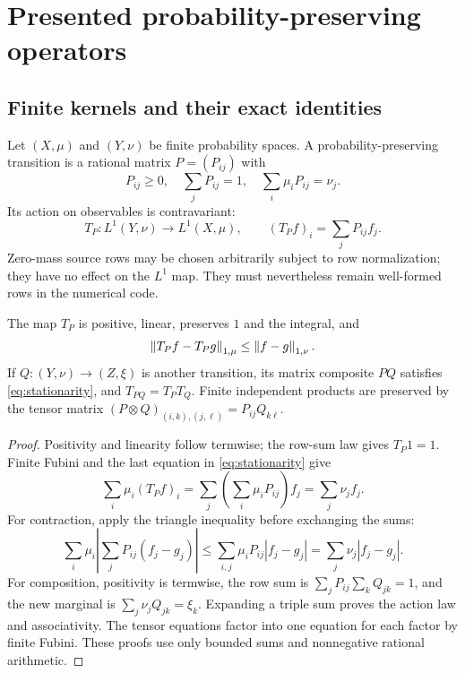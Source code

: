 \section{Presented probability-preserving operators}\label{sec:operators}

\subsection{Finite kernels and their exact identities}

Let $(X,\mu)$ and $(Y,\nu)$ be finite probability spaces. A
probability-preserving transition is a rational matrix $P=(P_{ij})$ with
\begin{equation}\label{eq:stationarity}
 P_{ij}\ge0,\quad \sum_jP_{ij}=1,\quad
 \sum_i\mu_iP_{ij}=\nu_j.
\end{equation}
Its action on observables is contravariant:
\[
 T_P:L^1(Y,\nu)\longrightarrow L^1(X,\mu),\qquad
 (T_Pf)_i=\sum_jP_{ij}f_j.
\]
Zero-mass source rows may be chosen arbitrarily subject to row
normalization; they have no effect on the $L^1$ map. They must nevertheless
remain well-formed rows in the numerical code.

\begin{theorem}\label{thm:finite-markov}
The map $T_P$ is positive, linear, preserves $1$ and the integral, and
\begin{equation}\label{eq:markov-contraction}
 \left\lVert T_Pf-T_Pg\right\rVert_{1,\mu}\le\left\lVert f-g\right\rVert_{1,\nu}.
\end{equation}
If $Q:(Y,\nu)\to(Z,\xi)$ is another transition, its matrix composite $PQ$
satisfies \eqref{eq:stationarity}, and $T_{PQ}=T_PT_Q$.
Finite independent products are preserved by the tensor matrix
$(P\otimes Q)_{(i,k),(j,\ell)}=P_{ij}Q_{k\ell}$.
\end{theorem}
\begin{proof}
Positivity and linearity follow termwise; the row-sum law gives $T_P1=1$.
Finite Fubini and the last equation in \eqref{eq:stationarity} give
\[
 \sum_i\mu_i(T_Pf)_i
 =\sum_j\left(\sum_i\mu_iP_{ij}\right)f_j
 =\sum_j\nu_jf_j.
\]
For contraction, apply the triangle inequality before exchanging the sums:
\[
 \sum_i\mu_i\left|\sum_jP_{ij}(f_j-g_j)\right|
 \le\sum_{i,j}\mu_iP_{ij}|f_j-g_j|
 =\sum_j\nu_j|f_j-g_j|.
\]
For composition, positivity is termwise, the row sum is
$\sum_jP_{ij}\sum_kQ_{jk}=1$, and the new marginal is
$\sum_j\nu_jQ_{jk}=\xi_k$. Expanding a triple sum proves the action law
and associativity. The tensor equations factor into one equation for each
factor by finite Fubini. These proofs use only bounded sums and
nonnegative rational arithmetic.
\end{proof}

